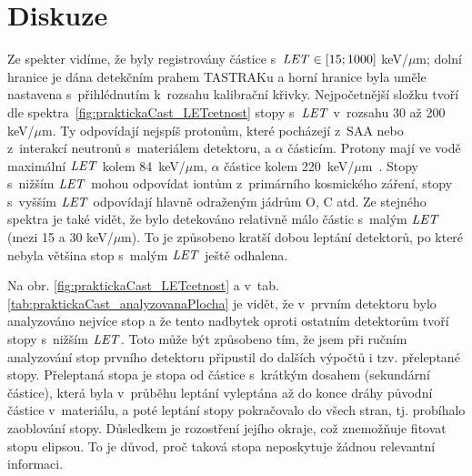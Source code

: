 \section{Diskuze}
Ze spekter vidíme, že byly registrovány částice s~$\mathit{LET}\in[15;1000]$ keV/$\mu$m; dolní hranice je dána detekčním prahem TASTRAKu a horní hranice byla uměle nastavena s~přihlédnutím k~rozsahu kalibrační křivky. Nejpočetnější složku tvoří dle spektra~\ref{fig:praktickaCast_LETcetnost} stopy s~$\mathit{LET}$ v~rozsahu 30 až 200 keV/$\mu$m. Ty odpovídají nejspíš protonům, které pocházejí z~SAA nebo z~interakcí neutronů s~materiálem detektoru, a $\alpha$ částicím. Protony mají ve vodě maximální $\mathit{LET}$ kolem 84~keV/$\mu$m, $\alpha$ částice kolem 220~keV/$\mu$m~\cite{SRIM}. Stopy s~nižším $\mathit{LET}$ mohou odpovídat iontům z~primárního kosmického záření, stopy s~vyšším $\mathit{LET}$ odpovídají hlavně odraženým jádrům O, C atd. Ze stejného spektra je
také vidět, že bylo detekováno relativně málo částic s~malým $\mathit{LET}$ (mezi 15 a 30 keV/$\mu$m). To je způsobeno kratší dobou leptání detektorů, po které nebyla většina stop s~malým $\mathit{LET}$ ještě odhalena. 

Na obr. \ref{fig:praktickaCast_LETcetnost} a v~tab. \ref{tab:praktickaCast_analyzovanaPlocha} je vidět, že v~prvním detektoru bylo analyzováno nejvíce stop a že tento nadbytek oproti ostatním detektorům tvoří stopy s~nižším $\mathit{LET}$. Toto může být způsobeno tím, že jsem při ručním analyzování stop prvního detektoru připustil do dalších výpočtů i tzv. přeleptané stopy. Přeleptaná stopa je stopa od částice s~krátkým dosahem (sekundární částice), která byla v~průběhu leptání vyleptána až do konce dráhy původní částice v~materiálu, a poté leptání stopy pokračovalo do všech stran, tj. probíhalo zaoblování stopy. Důsledkem je rozostření jejího okraje, což znemožňuje fitovat stopu elipsou. To je důvod, proč taková stopa neposkytuje žádnou relevantní informaci.

